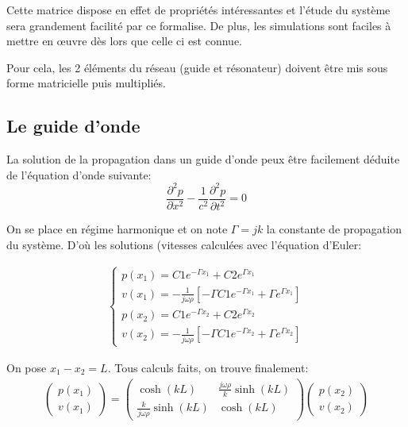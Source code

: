 Cette matrice dispose en effet de propriétés intéressantes et l'étude du système sera grandement facilité par ce formalise. De plus, les simulations sont faciles à mettre en œuvre dès lors que celle ci est connue.

Pour cela, les 2 éléments du réseau (guide et résonateur) doivent être mis sous forme matricielle puis multipliés.

\subsection{Le guide d'onde}
La solution de la propagation dans un guide d'onde peux être facilement déduite de l'équation d'onde suivante:
\begin{equation}
\frac{\partial ^2 p}{\partial x^2} -\frac{1}{c^{2}} \frac{\partial ^2 p}{\partial t^2}= 0
\end{equation}

On se place en régime harmonique et on note $\Gamma = jk$ la constante de propagation du système. D’où les solutions (vitesses calculées avec l'équation d'Euler:

\begin{eqnarray*}
\begin{cases}
p(x_1)  =  C1 e^{-\Gamma x_1} + C2 e^{\Gamma x_1} \\
v(x_1)  =  -\frac{1}{j\omega\rho} [ -\Gamma C1 e^{-\Gamma x_1} + \Gamma e^{\Gamma x_1}]\\
p(x_2)  =  C1 e^{-\Gamma x_2} + C2 e^{\Gamma x_2} \\
v(x_2)  =  -\frac{1}{j\omega\rho} [ -\Gamma C1 e^{-\Gamma x_2} + \Gamma e^{\Gamma x_2}]
\end{cases}
\end{eqnarray*}
 
On pose $x_1 - x_2 = L$. Tous calculs faits, on trouve finalement:
\begin{eqnarray*}
\begin{pmatrix} p(x_1) \\ v(x_1) \end{pmatrix} = \begin{pmatrix} \cosh(kL) & \frac{j\omega\rho}{k} \sinh(k L) \\  \frac{k}{j\omega\rho}\sinh(k L) & \cosh(k L) \end{pmatrix} \begin{pmatrix} p(x_2) \\ v(x_2) \end{pmatrix}
\end{eqnarray*}

